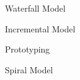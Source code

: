 \documentclass[12pt]{article}
\begin{document}
    \begin{figure}[hbtp]
        \centering
        \caption{Waterfall Model}
    \end{figure}
    \begin{figure}[hbtp]
        \centering
        \caption{Incremental Model}
    \end{figure}
    \begin{figure}[hbtp]
        \centering
        \caption{Prototyping}
    \end{figure}
    \begin{figure}[hbtp]
        \centering
        \caption{Spiral Model}
    \end{figure}
\end{document}

